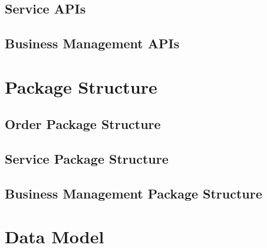 \documentclass[]{VUMIFTemplateClass}
\begin{document}
\subsection{Service APIs}
\subsection{Business Management APIs}

\section{Package Structure}

\subsection{Order Package Structure}
\subsection{Service Package Structure}  
\subsection{Business Management Package Structure}



\section{Data Model}
\end{document}
